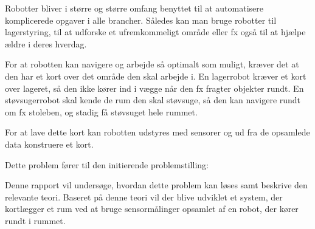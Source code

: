 Robotter bliver i større og større omfang benyttet til at automatisere komplicerede opgaver i alle brancher.\cite{robotter_i_alle_brancher}
Således kan man bruge robotter til lagerstyring, til at udforske et ufremkommeligt område eller fx også til at hjælpe ældre i deres hverdag.

For at robotten kan navigere og arbejde så optimalt som muligt, kræver det at den har et kort over det område den skal arbejde i.
En lagerrobot kræver et kort over lageret, så den ikke kører ind i vægge når den fx fragter objekter rundt.
En støvsugerrobot skal kende de rum den skal støvsuge, så den kan navigere rundt om fx stoleben, og stadig få støvsuget hele rummet.

For at lave dette kort kan robotten udstyres med sensorer og ud fra de opsamlede data konstruere et kort.

Dette problem fører til den initierende problemstilling:

Denne rapport vil undersøge, hvordan dette problem kan løses samt beskrive den relevante teori.
Baseret på denne teori vil der blive udviklet et system, der kortlægger et rum ved at bruge sensormålinger opsamlet af en robot, der kører rundt i rummet.
